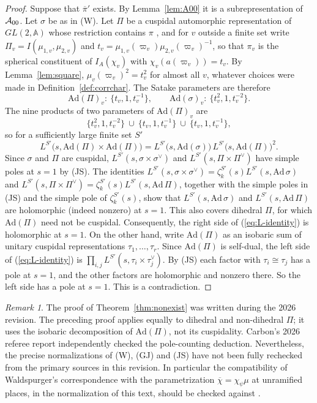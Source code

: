 \documentclass[12pt,letterpaper,openany]{book}
\theoremstyle{plain}
\theoremstyle{definition}
\theoremstyle{remark}
\theoremstyle{remark}
\newtheorem{remyy}{Remark}
\begin{document}
\begin{proof}
Suppose that $\overline\pi'$ exists. By Lemma~\ref{lem:A00} it is a
subrepresentation of ${\cal A}_{00}$. Let $\sigma$ be as in (W). Let $\Pi$
be a cuspidal automorphic representation of $GL(2,{\mathbb A})$ whose
restriction contains $\pi$ \cite{LL}, and for $v$ outside a finite set
write $\Pi_v=I(\mu_{1,v},\mu_{2,v})$ and
$t_v=\mu_{1,v}(\varpi_v)\mu_{2,v}(\varpi_v)^{-1}$, so that $\pi_v$ is the
spherical constituent of $I_A(\chi_v)$ with $\chi_v(a(\varpi_v))=t_v$.
By Lemma~\ref{lem:square}, $\mu_v(\varpi_v)^2=t_v^2$ for almost all $v$,
whatever choices were made in Definition~\ref{def:corrchar}. The Satake
parameters are therefore
\[
\mathrm{Ad}(\Pi)_v:\ \{t_v,1,t_v^{-1}\},\qquad
\mathrm{Ad}(\sigma)_v:\ \{t_v^2,1,t_v^{-2}\}.
\]
The nine products of two parameters of $\mathrm{Ad}(\Pi)_v$ are
\[
\{t_v^{2},1,t_v^{-2}\}\ \cup\ \{t_v,1,t_v^{-1}\}\ \cup\ \{t_v,1,t_v^{-1}\},
\]
so for a sufficiently large finite set $S'$
\begin{equation}\label{eq:L-identity}
L^{S'}\bigl(s,\mathrm{Ad}(\Pi)\times\mathrm{Ad}(\Pi)\bigr)
=L^{S'}\bigl(s,\mathrm{Ad}(\sigma)\bigr)\,
L^{S'}\bigl(s,\mathrm{Ad}(\Pi)\bigr)^2 .
\end{equation}
Since $\sigma$ and $\Pi$ are cuspidal,
$L^{S'}(s,\sigma\times\sigma^\vee)$ and $L^{S'}(s,\Pi\times\Pi^\vee)$ have
simple poles at $s=1$ by (JS). The identities
$L^{S'}(s,\sigma\times\sigma^\vee)
=\zeta_k^{S'}(s)L^{S'}(s,\mathrm{Ad}\,\sigma)$
and
$L^{S'}(s,\Pi\times\Pi^\vee)
=\zeta_k^{S'}(s)L^{S'}(s,\mathrm{Ad}\,\Pi)$,
together with the simple poles in (JS) and the simple pole of
$\zeta_k^{S'}(s)$, show that
$L^{S'}(s,\mathrm{Ad}\,\sigma)$ and
$L^{S'}(s,\mathrm{Ad}\,\Pi)$ are holomorphic (indeed nonzero)
at $s=1$. This also covers dihedral $\Pi$, for which
$\mathrm{Ad}(\Pi)$ need not be cuspidal.
Consequently, the right side of
(\ref{eq:L-identity}) is holomorphic at $s=1$. On the other hand, write
$\mathrm{Ad}(\Pi)$ as an isobaric sum of unitary cuspidal representations
$\tau_1,\dots,\tau_r$. Since $\mathrm{Ad}(\Pi)$ is self-dual, the left
side of (\ref{eq:L-identity}) is $\prod_{i,j}L^{S'}(s,\tau_i\times\tau_j^\vee)$.
By (JS) each factor with $\tau_i\cong\tau_j$ has a pole at $s=1$, and the
other factors are holomorphic and nonzero there. So the left side has a
pole at $s=1$. This is a contradiction.
\end{proof}

\begin{remyy}\label{rem26:nonexist}
The proof of Theorem~\ref{thm:nonexist} was written during the 2026
revision. The preceding proof applies equally to dihedral and non-dihedral
$\Pi$; it uses the isobaric decomposition of $\mathrm{Ad}(\Pi)$,
not its cuspidality. Carbon's 2026 referee report independently
checked the pole-counting deduction. Nevertheless, the precise
normalizations of (W), (GJ) and (JS) have not been fully
rechecked from the primary sources in this revision. In particular the
compatibility of Waldspurger's correspondence with the parametrization
$\overline\chi=\chi_\psi\mu$ at unramified places, in the normalization of
this text, should be checked against \cite{Wa2}.
\end{remyy}
\end{document}
